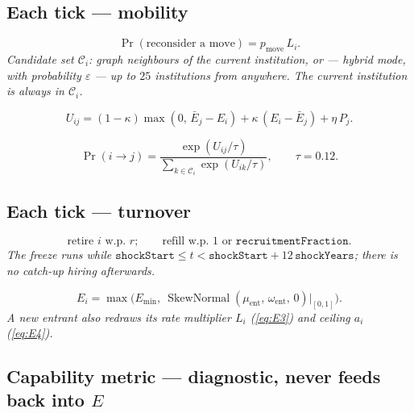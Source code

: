 \documentclass[11pt]{article}
\newcommand{\eqn}[1]{\eqref{eq:#1}}
\newcommand{\eqnote}[1]{{\small\itshape #1}\par\addvspace{4pt}}
\begin{document}
\subsection*{Each tick --- mobility}

\begin{equation}\label{eq:E13}
  \Pr(\text{reconsider a move}) = p_{\text{move}}\, L_i .
\end{equation}
\eqnote{Candidate set $\mathcal{C}_i$: graph neighbours of the current
institution, or --- hybrid mode, with probability $\varepsilon$ --- up to $25$
institutions from anywhere. The current institution is always in
$\mathcal{C}_i$.}

\begin{equation}\label{eq:E14}
  U_{ij} = (1-\kappa)\max(0,\, \bar E_j - E_i)
         + \kappa\,(E_i - \bar E_j)
         + \eta\, P_j .
\end{equation}

\begin{equation}\label{eq:E15}
  \Pr(i \to j) = \frac{\exp(U_{ij}/\tau)}
                      {\sum_{k \in \mathcal{C}_i} \exp(U_{ik}/\tau)},
  \qquad \tau = 0.12 .
\end{equation}

\subsection*{Each tick --- turnover}

\begin{equation}\label{eq:E16}
  \text{retire } i \text{ w.p. } r; \qquad
  \text{refill w.p. } 1 \text{ or } \texttt{recruitmentFraction}.
\end{equation}
\eqnote{The freeze runs while
$\texttt{shockStart} \le t < \texttt{shockStart} + 12\,\texttt{shockYears}$; there
is no catch-up hiring afterwards.}

\begin{equation}\label{eq:E17}
  E_i = \max\!\bigl(E_{\min},\
        \operatorname{SkewNormal}(\mu_{\text{ent}},\, \omega_{\text{ent}},\, 0)
        \big|_{[0,1]}\bigr).
\end{equation}
\eqnote{A new entrant also redraws its rate multiplier $L_i$ (\eqn{E3}) and
ceiling $a_i$ (\eqn{E4}).}

\subsection*{Capability metric --- diagnostic, never feeds back into $E$}
\end{document}

